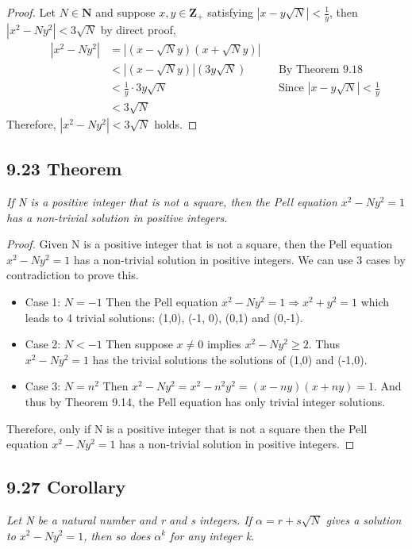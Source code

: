 \documentclass{article}
\begin{document}
\begin{proof}
Let $N \in \mathbf{N}$ and suppose $x,y \in \mathbf{Z_+}$ satisfying $|x-y\sqrt{N}| < \frac{1}{y}$, then $|x^2 - Ny^2| < 3\sqrt{N}$ by direct proof,
\begin{align*}
    && |x^2 - Ny^2| &= |(x - \sqrt{N} y)(x + \sqrt{N} y)| &&\\
    &&              &< |(x - \sqrt{N} y)|(3y\sqrt{N}) && \text{By Theorem 9.18}\\
    &&              &< \frac{1}{y} \cdot 3y\sqrt{N} && \text{Since $|x-y\sqrt{N}| < \frac{1}{y}$}\\
    &&              &< 3\sqrt{N} &&
\end{align*}
Therefore, $|x^2 - Ny^2| < 3\sqrt{N}$ holds.
\end{proof}

\subsection*{9.23 Theorem} 
\quad \textit{If N is a positive integer that is not a square, then the Pell equation $x^2 - Ny^2 = 1$ has a non-trivial solution in positive integers.}

\begin{proof}
Given N is a positive integer that is not a square, then the Pell equation $x^2 - Ny^2 = 1$ has a non-trivial solution in positive integers. We can use 3 cases by contradiction to prove this.
\begin{itemize}
    \item Case 1: $N = -1$
    Then the Pell equation $x^2 - Ny^2 = 1 \Longrightarrow x^2 + y^2 = 1$ which leads to 4 trivial solutions: (1,0), (-1, 0), (0,1) and (0,-1).
    \item Case 2: $N < -1$
    Then suppose $x \neq 0$ implies $x^2 - Ny^2 \geq 2$. Thus $x^2 - Ny^2 = 1$ has the trivial solutions the solutions of (1,0) and (-1,0). 
    \item Case 3: $N = n^2$
    Then $x^2 - Ny^2 = x^2 - n^2y^2 = (x - ny)(x + ny) = 1$. And thus by Theorem 9.14, the Pell equation has only trivial integer solutions.
\end{itemize}
Therefore, only if N is a positive integer that is not a square then the Pell equation $x^2 - Ny^2 = 1$ has a non-trivial solution in positive integers.
\end{proof}

\subsection*{9.27 Corollary} 
\quad \textit{Let N be a natural number and r and s integers. If $\alpha = r+s\sqrt{N}$ gives a solution to $x^2 - Ny^2 = 1$, then so does $\alpha^k$ for any integer k.}
\end{document}
